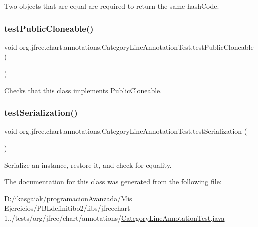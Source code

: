 Two objects that are equal are required to return the same hash\+Code. \mbox{\label{classorg_1_1jfree_1_1chart_1_1annotations_1_1_category_line_annotation_test_a581717db023cba2788880a6de3d4cefd}} 
\subsubsection{\texorpdfstring{test\+Public\+Cloneable()}{testPublicCloneable()}}
{\footnotesize\ttfamily void org.\+jfree.\+chart.\+annotations.\+Category\+Line\+Annotation\+Test.\+test\+Public\+Cloneable (\begin{DoxyParamCaption}{ }\end{DoxyParamCaption})}

Checks that this class implements Public\+Cloneable. \mbox{\label{classorg_1_1jfree_1_1chart_1_1annotations_1_1_category_line_annotation_test_a464acb868c554b76fe1b43e92e77ab49}} 
\subsubsection{\texorpdfstring{test\+Serialization()}{testSerialization()}}
{\footnotesize\ttfamily void org.\+jfree.\+chart.\+annotations.\+Category\+Line\+Annotation\+Test.\+test\+Serialization (\begin{DoxyParamCaption}{ }\end{DoxyParamCaption})}

Serialize an instance, restore it, and check for equality. 

The documentation for this class was generated from the following file\+:\begin{DoxyCompactItemize}
\item 
D\+:/ikasgaiak/programacion\+Avanzada/\+Mis Ejercicios/\+P\+B\+Ldefinitibo2/libs/jfreechart-\/1../tests/org/jfree/chart/annotations/\mbox{\hyperlink{_category_line_annotation_test_8java}{Category\+Line\+Annotation\+Test.\+java}}\end{DoxyCompactItemize}
